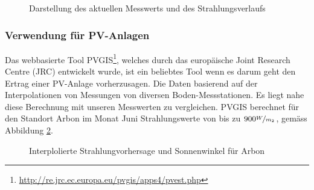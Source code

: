 
\begin{figure}[htbp]
	\centering
	\caption{Darstellung des aktuellen Messwerts und des Strahlungsverlaufs}
	\label{img:radiation}
\end{figure}


\subsubsection{Verwendung für PV-Anlagen}
Das webbasierte Tool PVGIS\footnote{\url{http://re.jrc.ec.europa.eu/pvgis/apps4/pvest.php}}, welches durch das europäische Joint Research Centre (JRC) entwickelt wurde, ist ein beliebtes Tool wenn es darum geht den Ertrag einer PV-Anlage vorherzusagen. Die Daten basierend auf der Interpolationen von Messungen von diversen Boden-Messstationen. Es liegt nahe diese Berechnung mit unseren Messwerten zu vergleichen. PVGIS berechnet für den Standort Arbon im Monat Juni Strahlungswerte von bis zu $900 \nicefrac{W}{m_2}$, gemäss Abbildung \ref{img:pvgis}.

\begin{figure}[htbp]
	\centering
	\caption{Interplolierte Strahlungvorhersage und Sonnenwinkel für Arbon}
	\label{img:pvgis}
\end{figure}




